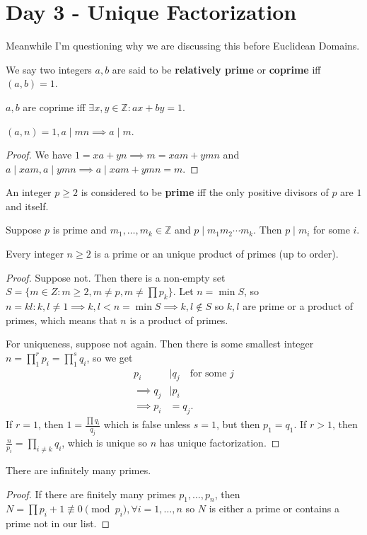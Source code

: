 \section{Day 3 - Unique Factorization}

Meanwhile I'm questioning why we are discussing this before Euclidean
Domains.

\begin{df}
We say two integers $a, b$ are said to be \textbf{relatively prime} or
\textbf{coprime} iff $(a, b) = 1$.
\end{df}

\begin{rem}
$a, b$ are coprime iff $\exists x, y \in \mathbb{Z} : ax + by = 1$.
\end{rem}

\begin{thm}
$(a, n) = 1, a \mid mn \implies a \mid m$.
\end{thm}

\begin{proof}
We have $1 = xa + yn \implies m = xam + ymn$ and $a \mid xam, a \mid ymn
\implies a \mid xam + ymn = m$.
\end{proof}

\begin{df}
An integer $p \geq 2$ is considered to be \textbf{prime} iff the only
positive divisors of $p$ are $1$ and itself.
\end{df}

\begin{cor}
Suppose $p$ is prime and $m_1, \dots, m_k \in \mathbb{Z}$ and $p \mid
m_1 m_2 \cdots m_k$. Then $p \mid m_i$ for some $i$.
\end{cor}

\begin{thm}
Every integer $n \geq 2$ is a prime or an unique product of primes (up
to order).
\end{thm}

\begin{proof}
Suppose not. Then there is a non-empty set $S = \lbrace m \in Z : m \geq
2, m \neq p, m \neq \prod p_k \rbrace$. Let $n = \min S$, so $n = kl :
k, l \neq 1 \implies k, l < n = \min S \implies k, l \not \in S$ so $k,
l$ are prime or a product of primes, which means that $n$ is a product
of primes.

For uniqueness, suppose not again. Then there is some smallest integer
$n = \prod_1^r p_i = \prod_1^s q_i$, so we get
\[ \begin{aligned}
p_i & \mid q_j \quad \textrm{for some } j \\
\implies q_j & \mid p_i \\
\implies p_i &= q_j.
\end{aligned} \]
If $r = 1$, then $1 = \frac{\prod q_i}{q_j}$ which is false unless $s =
1$, but then $p_1 = q_1$. If $r > 1$, then $\frac{n}{p_i} = \prod_{i
\neq k} q_i$, which is unique so $n$ has unique factorization.
\end{proof}

\begin{thm}[Euclid]
There are infinitely many primes.
\end{thm}

\begin{proof}
If there are finitely many primes $p_1, \dots, p_n$, then $N = \prod p_i
+ 1 \not \equiv 0 \pmod{p_i}, \forall i = 1, \dots, n$ so $N$ is either
a prime or contains a prime not in our list.
\end{proof}
